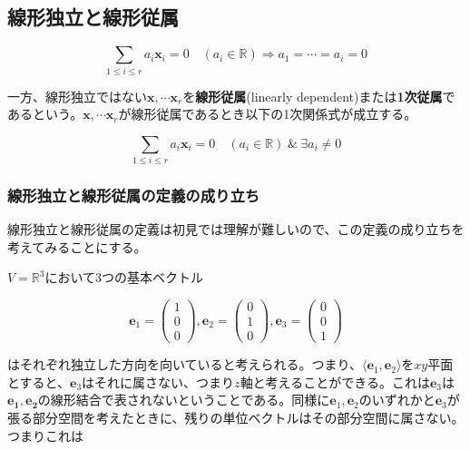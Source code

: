 \documentclass[dvipdfmx,autodetect-engine]{jsarticle}
\theoremstyle{definition}
\newcommand{\vecSpace}[1]{\mathbb{R}^{#1}}
\begin{document}
\subsection{線形独立と線形従属}

\label{defi:linearlyIndependent}

$$
\sum_{1 \leq i \leq r} a_i\bm{x}_i = 0 \quad (a_i \in \mathbb{R}) \Longrightarrow a_1 = \cdots = a_i = 0
$$

一方、線形独立ではない$\bm{x}, \cdots \bm{x}_r$を{\bf 線形従属}(linearly dependent)または{\bf 1次従属}であるという。$\bm{x}, \cdots \bm{x}_r$が線形従属であるとき以下の1次関係式が成立する。

$$
\sum_{1 \leq i \leq r} a_i\bm{x}_i = 0 \quad (a_i \in \mathbb{R}) \hspace{3pt} \& \hspace{3pt} \exists a_i \neq 0
$$

\subsubsection{線形独立と線形従属の定義の成り立ち}

線形独立と線形従属の定義は初見では理解が難しいので、この定義の成り立ちを考えてみることにする。

$V = \vecSpace{3}$において3つの基本ベクトル

$$
\bm{e}_1 = \begin{pmatrix}
1 \\
0 \\
0
\end{pmatrix}, 
\bm{e}_2 = \begin{pmatrix}
0 \\
1 \\
0
\end{pmatrix}, 
\bm{e}_3 = \begin{pmatrix}
0 \\
0 \\
1
\end{pmatrix}
$$

はそれぞれ独立した方向を向いていると考えられる。つまり、$\langle \bm{e}_1, \bm{e}_2 \rangle$を$xy$平面とすると、$\bm{e}_3$はそれに属さない、つまり$z$軸と考えることができる。これは$\bm{e}_3$は$\bm{e_1}, \bm{e_2}$の線形結合で表されないということである。同様に$\bm{e}_1, \bm{e}_2$のいずれかと$\bm{e}_3$が張る部分空間を考えたときに、残りの単位ベクトルはその部分空間に属さない。つまりこれは
\end{document}
